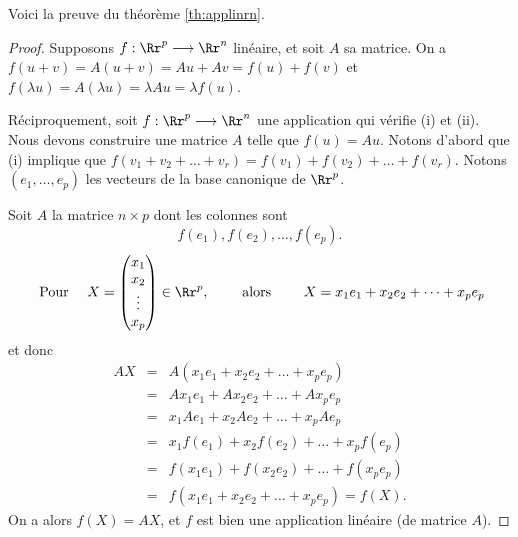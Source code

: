 \documentclass[class=report,crop=false]{standalone}
\begin{document}
Voici la preuve du théorème \ref{th:applinrn}.
\begin{proof}
Supposons $f: \Rr^p \longrightarrow \Rr^n$ linéaire, et soit $A$ sa
matrice. On a $f(u+v) = A(u+v) = Au + Av = f(u) + f(v)$
et $f(\lambda u) = A(\lambda u) = \lambda Au = \lambda f(u)$.

Réciproquement, soit $f: \Rr^p \longrightarrow \Rr^n$ une application qui vérifie
(i) et (ii). Nous devons construire une matrice $A$ telle que $f(u)=Au$.
Notons d'abord que (i) implique que $f(v_1 + v_2 + \dots + v_r) = f(v_1) + f(v_2) + \dots
  + f(v_r)$.
Notons $(e_1, \ldots , e_p)$ les vecteurs de la base canonique de $\Rr^p$.

Soit $A$ la matrice $n\times p$  dont les colonnes sont
$$f(e_1), f(e_2), \ldots , f(e_p).$$
$$\text{ Pour } \quad X = \begin{pmatrix}x_1\\x_2\\ \vdots\\x_p\end{pmatrix} \in \Rr^p,
\qquad \text{ alors } \qquad X = x_1 e_1 + x_2 e_2 + \dots + x_p e_p$$
et donc
\begin{eqnarray*}
AX
& = & A (x_1e_1 + x_2 e_2 + \dots + x_pe_p) \\
& = & Ax_1e_1 + Ax_2 e_2 + \dots + Ax_pe_p \\
& = & x_1 Ae_1 + x_2 Ae_2 + \dots + x_p Ae_p \\
& = & x_1 f(e_1) + x_2 f(e_2) + \dots + x_p f(e_p) \\
& = & f (x_1e_1) + f(x_2e_2) + \dots + f(x_pe_p) \\
& = & f(x_1e_1 + x_2 e_2 + \dots + x_p e_p) = f(X).
\end{eqnarray*}
On a alors $f(X)=AX$, et $f$ est bien une application linéaire (de matrice $A$).
\end{proof}





\end{document}

